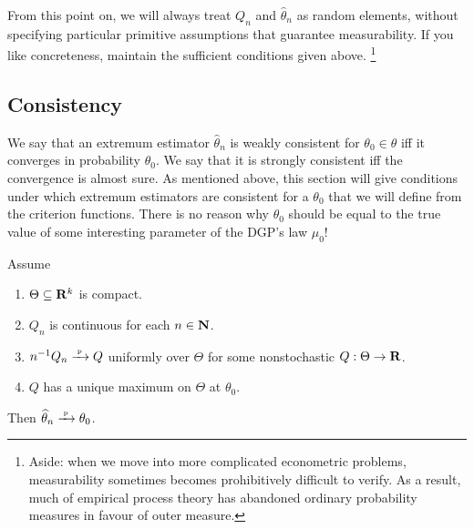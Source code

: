 \documentclass[11pt,letterpaper,reqno,oneside]{article}
\begin{document}
From this point on, we will always treat $Q_n$ and $\widehat{\theta}_n$ as random elements, without specifying particular primitive assumptions that guarantee measurability. If you like concreteness, maintain the sufficient conditions given above.%
	\footnote{Aside: when we move into more complicated econometric problems, measurability sometimes becomes prohibitively difficult to verify. As a result, much of empirical process theory has abandoned ordinary probability measures in favour of outer measure.}



\subsection{Consistency}
\label{sec:extremum:consistency}

We say that an extremum estimator $\widehat{\theta}_n$ is weakly consistent for $\theta_0 \in \theta$ iff it converges in probability $\theta_0$. We say that it is strongly consistent iff the convergence is almost sure. As mentioned above, this section will give conditions under which extremum estimators are consistent for a $\theta_0$ that we will define from the criterion functions. There is no reason why $\theta_0$ should be equal to the true value of some interesting parameter of the DGP's law $\mu_0$!


\begin{proposition}
	\label{proposition:weak_consistency}
	Assume
	\begin{enumerate}

		\item $\Theta \subseteq \mathbf{R}^k$ is compact.

		\item $Q_n$ is continuous for each $n \in \mathbf{N}$.

		\item $n^{-1} Q_n \xrightarrow{{\scriptscriptstyle \mathrm{\;p\;}}} Q$ uniformly over $\Theta$ for some nonstochastic $Q : \Theta \to \mathbf{R}$.

		\item $Q$ has a unique maximum on $\Theta$ at $\theta_0$.

	\end{enumerate}
	Then $\widehat{\theta}_n \xrightarrow{{\scriptscriptstyle \mathrm{\;p\;}}} \theta_0$.
\end{proposition}
\end{document}
